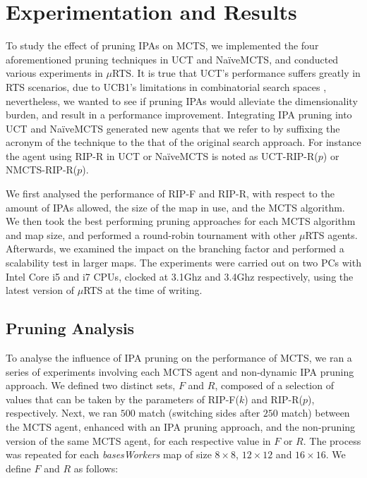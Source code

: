 \documentclass[conference]{IEEEtran}
\newcommand{\mRTS}{$\mu$RTS}
\begin{document}


\section{Experimentation and Results}
\label{sec:experiments}


To study the effect of pruning IPAs on MCTS, we implemented the four aforementioned pruning techniques in UCT and NaïveMCTS, and conducted various experiments in \mRTS{}. It is true that UCT's performance suffers greatly in RTS scenarios, due to UCB1's limitations in combinatorial search spaces \cite{ontanon_combinatorial_2013}, nevertheless, we wanted to see if pruning IPAs would alleviate the dimensionality burden, and result in a performance improvement. Integrating IPA pruning into UCT and NaïveMCTS generated new agents that we refer to by suffixing the acronym of the technique to the that of the original search approach. For instance the agent using RIP-R in UCT or NaïveMCTS is noted as UCT-RIP-R($p$) or NMCTS-RIP-R($p$).

We first analysed the performance of RIP-F and RIP-R, with respect to the amount of IPAs allowed, the size of the map in use, and the MCTS algorithm. We then took the best performing pruning approaches for each MCTS algorithm and map size, and performed a round-robin tournament with other \mRTS{} agents. Afterwards, we examined the impact on the branching factor and performed a scalability test in larger maps. The experiments were carried out on two PCs with Intel Core i5 and i7 CPUs, clocked at 3.1Ghz and 3.4Ghz respectively, using the latest version of \mRTS{} at the time of writing.


\subsection{Pruning Analysis}

To analyse the influence of IPA pruning on the performance of MCTS, we ran a series of experiments involving each MCTS agent and non-dynamic IPA pruning approach. We defined two distinct sets, $F$ and $R$, composed of a selection of values that can be taken by the parameters of RIP-F($k$) and RIP-R($p$), respectively. Next, we ran $500$ match (switching sides after $250$ match) between the MCTS agent, enhanced with an IPA pruning approach, and the non-pruning version of the same MCTS agent, for each respective value in $F$ or $R$. The process was repeated for each \textit{basesWorkers} map of size $8\times8$, $12\times12$ and $16\times16$. We define $F$ and $R$ as follows:
\end{document}
